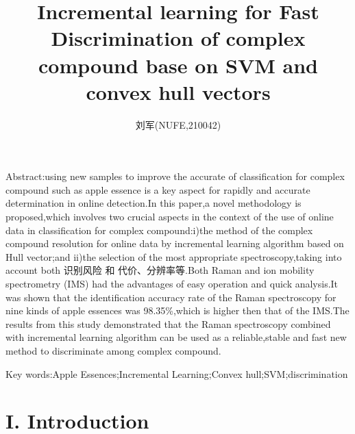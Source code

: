 \documentclass[a4paper]{article}
\author{刘军(NUFE,210042)}
\date{}
\title{Incremental learning for Fast Discrimination of complex compound base on SVM and convex hull vectors }
\begin{document}
\maketitle


Abstract:using new samples to improve the accurate of classification for complex compound such as apple essence is a key aspect for rapidly and accurate determination in online detection.In this paper,a novel methodology is proposed,which involves two crucial aspects in the context of the use of online data in classification for complex compound:i)the method of the complex compound resolution for online data by incremental learning algorithm based on Hull vector;and ii)the selection of the most appropriate spectroscopy,taking into account both 识别风险 和 代价、分辨率等.Both Raman and ion mobility spectrometry (IMS) had the advantages of easy operation and  quick  analysis.It was shown that the identification accuracy rate of the Raman spectroscopy for nine kinds of apple essences was 98.35\%,which is higher then that of the IMS.The results from this study demonstrated that the Raman spectroscopy combined with incremental learning algorithm can be used as a reliable,stable and fast new method to discriminate among complex compound.



Key words:Apple Essences;Incremental Learning;Convex hull;SVM;discrimination
\section{I. Introduction}
\end{document}
